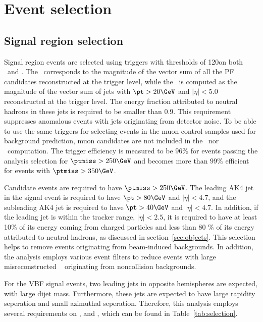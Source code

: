 \section{Event selection}
\label{sec:selection}

\subsection{Signal region selection}
\label{sec:selection_sr}
Signal region events are selected using triggers with thresholds of 120\GeV on both \ptmisstrig~and \mhttrig.
The \ptmisstrig~corresponds to the magnitude of the vector \ptvec sum of all the PF candidates reconstructed at the trigger level, 
while the \mhttrig~is computed as the magnitude of the vector \ptvec sum of jets with $\pt > 20\GeV$ and $|\eta| < 5.0$ reconstructed 
at the trigger level. The energy fraction attributed to neutral hadrons in these jets is required to be smaller than 0.9. 
This requirement suppresses anomalous events with jets originating from detector noise. 
To be able to use the same triggers for selecting events in the muon control samples used for background prediction, muon candidates are not included in the \ptmisstrig~nor \mhttrig~computation. 
The trigger efficiency is measured to be $96\%$ for events passing the analysis selection for $\ptmiss > 250\GeV$ and becomes more than $99\%$ efficient for events with $\ptmiss > 350\GeV$.

Candidate events are required to have $\ptmiss > 250\GeV$. 
The leading AK4 jet in the signal event is required to have $ \pt > 80\GeV $ and $|\eta| < 4.7$, and the subleading AK4 jet is 
required to have $ \pt > 40\GeV$ and $|\eta| < 4.7$. In addition, if the leading jet is within the tracker range, $|\eta| < 2.5$,
it is required to have at least 10\% of its energy coming from charged particles and less than 80 \% of its energy attributed to 
neutral hadrons, as discussed in section~\ref{sec:objects}. This selection helps to remove events originating from beam-induced backgrounds. 
In addition, the analysis employs various event filters to reduce events with large misreconstructed \ptmiss~\cite{Sirunyan:2019kia} originating from noncollision backgrounds.

For the VBF signal events, two leading jets in opposite hemispheres are expected, with large dijet mass. Furthermore, these jets are 
expected to have large rapidity seperation and small azimuthal seperation. Therefore, this analysis employs several requirements on 
\mjj, \detajj and \dphijj, which can be found in Table~\ref{tab:selection}.

